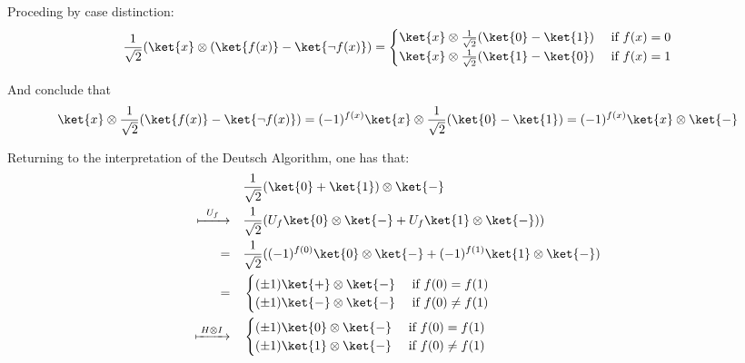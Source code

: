   Proceding by case distinction:
  \begin{equation}
    \frac{1}{\sqrt{2}}(\ket{x} \otimes (\ket{f(x)}-\ket{\neg f(x)}) = 
    \begin{cases}
      \ket{x} \otimes \frac{1}{\sqrt{2}}(\ket{0}-\ket{1}) &\text{ if } f(x)=0    \\
      \ket{x} \otimes \frac{1}{\sqrt{2}}(\ket{1}-\ket{0}) &\text{ if }   f(x)= 1 
    \end{cases}
  \end{equation}
  
  And conclude that
  \begin{equation}
   \ket{x} \otimes  \frac{1}{\sqrt{2}}(\ket{f(x)}-\ket{\neg f(x)}) = (-1)^{f(x)} \ket{x} \otimes \frac{1}{\sqrt{2}}(\ket{0}-\ket{1}) = (-1)^{f(x)} \ket{x} \otimes \ket{-}
  \end{equation}
  
  Returning to the interpretation of the Deutsch Algorithm, one has that:
  \begin{equation}
  \begin{split}
    \quad & \frac{1}{\sqrt{2}}(\ket{0} + \ket{1}) \otimes \ket{-}\\
    \xmapsto{ \hspace{5 pt} U_{f} \hspace{5pt}} \quad & \frac{1}{\sqrt{2}}( U_{f} \ket{0} \otimes \ket{-} + U_{f} \ket{1} \otimes \ket{-})) \\
    = \quad & \frac{1}{\sqrt{2}}( (-1)^{f(0)} \ket{0} \otimes \ket{-} + (-1)^{f(1)} \ket{1} \otimes \ket{-}) \\
    = \quad &
    \begin{cases}
      (\pm 1) \ket{+} \otimes \ket{-} &\text{ if }   f(0)= f(1) \\
      (\pm 1) \ket{-} \otimes \ket{-} &\text{ if }   f(0) \neq f(1)
    \end{cases} \\
    \xmapsto{ \hspace{2pt} H \otimes I \hspace{2pt}} \quad & 
    \begin{cases}
      (\pm 1) \ket{0} \otimes \ket{-} &\text{ if }   f(0)= f(1) \\
      (\pm 1) \ket{1} \otimes \ket{-} &\text{ if }   f(0) \neq f(1)\\
    \end{cases} 
  \end{split}
  \end{equation}
  
